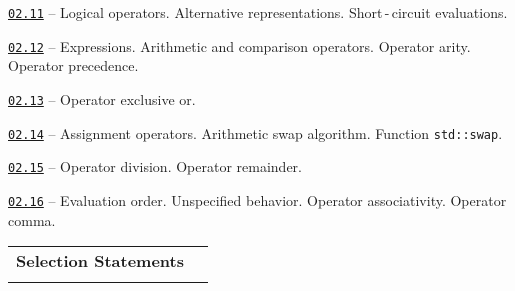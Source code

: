 \documentclass[a4paper,12pt]{article}
\renewenvironment{itemize}
{
    \begin{list}{\labelitemi}
    {
      \setlength{\topsep}{0pt}
      \setlength{\partopsep}{0pt}
      \setlength{\parskip}{0pt}
      \setlength{\itemsep}{0pt}
      \setlength{\parsep}{0pt}
      \setlength{\leftmargin}{14.5pt}
    }
}{\end{list}}
\begin{document}
\begin{itemize}

    \item \href{https://github.com/i-s-m-mipt/Education/blob/master/projects/examples/source/02.11.cpp}{\texttt{02.11}} -- Logical operators. Alternative representations. Short\,-\,circuit evaluations.

    \smallskip

    \item \href{https://github.com/i-s-m-mipt/Education/blob/master/projects/examples/source/02.12.cpp}{\texttt{02.12}} -- Expressions. Arithmetic and comparison operators. Operator arity. Operator precedence.

    \smallskip

    \item \href{https://github.com/i-s-m-mipt/Education/blob/master/projects/examples/source/02.13.cpp}{\texttt{02.13}} -- Operator exclusive or.

    \smallskip

    \item \href{https://github.com/i-s-m-mipt/Education/blob/master/projects/examples/source/02.14.cpp}{\texttt{02.14}} -- Assignment operators. Arithmetic swap algorithm. Function \lstinline{std::swap}.

    \smallskip

    \item \href{https://github.com/i-s-m-mipt/Education/blob/master/projects/examples/source/02.15.cpp}{\texttt{02.15}} -- Operator division. Operator remainder.

    \smallskip

    \item \href{https://github.com/i-s-m-mipt/Education/blob/master/projects/examples/source/02.16.cpp}{\texttt{02.16}} -- Evaluation order. Unspecified behavior. Operator associativity. Operator comma.

\end{itemize}

\bigskip\medskip

\begin{tabular}{!{\vrule width 1pt}L{4.2cm}!{\vrule width 1pt}L{14.8cm}!{\vrule width 0pt}} 


\textbf{Selection Statements} & \\


\end{tabular}
\end{document}
